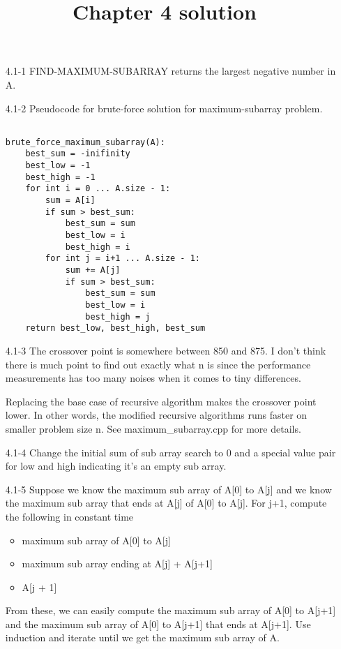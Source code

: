 \documentclass[]{article}
\title{}
\author{}
\begin{document}
\title{Chapter 4 solution}
\maketitle

\begin{enumerate}
\item[4.1-1] FIND-MAXIMUM-SUBARRAY returns the largest negative number in A.

\item[4.1-2] Pseudocode for brute-force solution for maximum-subarray problem.

\begin{verbatim}
	
brute_force_maximum_subarray(A):
    best_sum = -inifinity
    best_low = -1
    best_high = -1
    for int i = 0 ... A.size - 1:
        sum = A[i]
        if sum > best_sum:
            best_sum = sum
            best_low = i
            best_high = i
        for int j = i+1 ... A.size - 1:
            sum += A[j]
            if sum > best_sum:
                best_sum = sum
                best_low = i
                best_high = j
    return best_low, best_high, best_sum
\end{verbatim}

\item[4.1-3] The crossover point is somewhere between 850 and 875. I don't think there is much point to find out exactly what n is since the performance measurements has too many noises when it comes to tiny differences. 

Replacing the base case of recursive algorithm makes the crossover point lower. In other words, the modified recursive algorithms runs faster on smaller problem size n. See maximum\_subarray.cpp for more details.

\item[4.1-4] Change the initial sum of sub array search to 0 and a special value pair for low and high indicating it's an empty sub array.

\item[4.1-5] Suppose we know the maximum sub array of A[0] to A[j] and we know the maximum sub array that ends at A[j] of A[0] to A[j]. For j+1, compute the following in constant time

\begin{itemize}
    \item maximum sub array of A[0] to A[j]
    \item maximum sub array ending at A[j] + A[j+1]
    \item A[j + 1]
\end{itemize}

From these, we can easily compute the maximum sub array of A[0] to A[j+1] and the maximum sub array of A[0] to A[j+1] that ends at A[j+1]. Use induction and iterate until we get the maximum sub array of A.

\end{enumerate}
\end{document}
